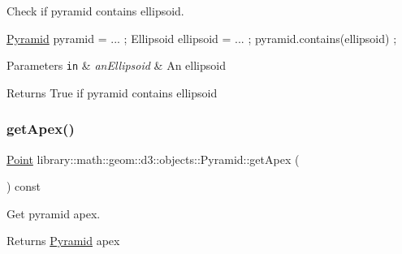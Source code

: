 Check if pyramid contains ellipsoid. 


\begin{DoxyCode}
\hyperlink{classlibrary_1_1math_1_1geom_1_1d3_1_1objects_1_1_pyramid_aafaaeed187584040b306b7de7ee57fd4}{Pyramid} pyramid = ... ;
Ellipsoid ellipsoid = ... ;
pyramid.contains(ellipsoid) ;
\end{DoxyCode}



\begin{DoxyParams}[1]{Parameters}
\mbox{\tt in}  & {\em an\+Ellipsoid} & An ellipsoid \\
\hline
\end{DoxyParams}
\begin{DoxyReturn}{Returns}
True if pyramid contains ellipsoid 
\end{DoxyReturn}
\mbox{\label{classlibrary_1_1math_1_1geom_1_1d3_1_1objects_1_1_pyramid_af24d52592c3154d633f694411d11396c}} 
\subsubsection{\texorpdfstring{get\+Apex()}{getApex()}}
{\footnotesize\ttfamily \hyperlink{classlibrary_1_1math_1_1geom_1_1d3_1_1objects_1_1_point}{Point} library\+::math\+::geom\+::d3\+::objects\+::\+Pyramid\+::get\+Apex (\begin{DoxyParamCaption}{ }\end{DoxyParamCaption}) const}



Get pyramid apex. 

\begin{DoxyReturn}{Returns}
\hyperlink{classlibrary_1_1math_1_1geom_1_1d3_1_1objects_1_1_pyramid}{Pyramid} apex 
\end{DoxyReturn}
\mbox{\label{classlibrary_1_1math_1_1geom_1_1d3_1_1objects_1_1_pyramid_a247e3c188d7919b2043e59d46b67c2ef}} 
